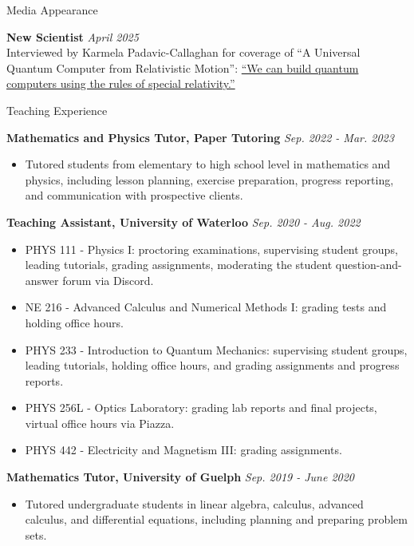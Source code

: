\documentclass{resume} %
\begin{document}
\begin{rSection}{Media Appearance}

{\bf New Scientist}
\hfill\textit{{April 2025}}\\
Interviewed by Karmela Padavic-Callaghan for coverage of ``A Universal Quantum Computer from Relativistic Motion'': \href{https://www.newscientist.com/article/2477409-we-can-build-quantum-computers-using-the-rules-of-special-relativity/}{``We can build quantum computers using the rules of special relativity.''}

\end{rSection}

\vspace{1em}

\begin{rSection}{Teaching Experience}

{\bf Mathematics and Physics Tutor, Paper Tutoring}
\hfill\textit{{Sep. 2022 - Mar. 2023}}
\begin{itemize}
\item Tutored students from elementary to high school level in mathematics and physics, including lesson planning, exercise preparation, progress reporting, and communication with prospective clients.
\end{itemize}

{\bf Teaching Assistant, University of Waterloo}
\hfill\textit{{Sep. 2020 - Aug. 2022}}
\begin{itemize}
\item PHYS 111 - Physics I: proctoring examinations, supervising student groups, leading tutorials, grading assignments, moderating the student question-and-answer forum via Discord.
\item NE 216 - Advanced Calculus and Numerical Methods I: grading tests and holding office hours.
\item PHYS 233 - Introduction to Quantum Mechanics: supervising student groups, leading tutorials, holding office hours, and grading assignments and progress reports.
\item PHYS 256L - Optics Laboratory: grading lab reports and final projects, virtual office hours via Piazza.
\item PHYS 442 - Electricity and Magnetism III: grading assignments.
\end{itemize}

{\bf Mathematics Tutor, University of Guelph}
\hfill\textit{{Sep. 2019 - June 2020}}
\begin{itemize}
\item Tutored undergraduate students in linear algebra, calculus, advanced calculus, and differential equations, including planning and preparing problem sets.
\end{itemize}

\end{rSection}
\end{document}
